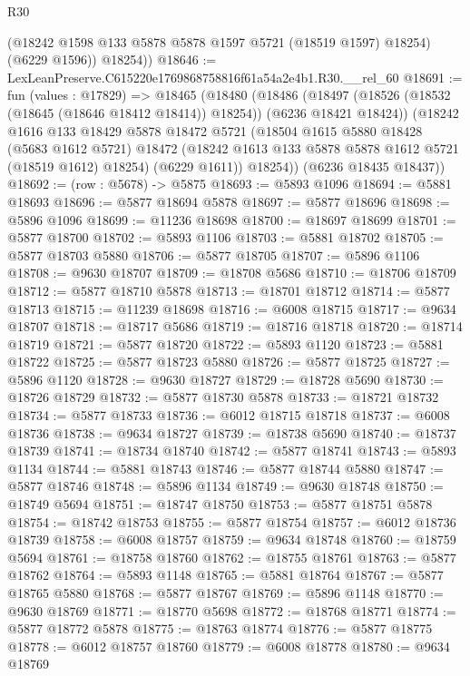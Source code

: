 \begin{lexlean}{R30}
\begin{coremodule}
          (@18242 @1598 @133 @5878 @5878 @1597 @5721 (@18519 @1597) @18254)
          (@6229 @1596))
        @18254))
@18646 := LexLeanPreserve.C615220e1769868758816f61a54a2e4b1.R30.__rel_60
@18691 := fun (values : @17829) =>
  @18465
    (@18480
      (@18486
        (@18497 (@18526 (@18532 (@18645 (@18646 @18412 @18414)) @18254)) (@6236 @18421 @18424))
        (@18242
          @1616
          @133
          @18429
          @5878
          @18472
          @5721
          (@18504
            @1615
            @5880
            @18428
            (@5683 @1612 @5721)
            @18472
            (@18242 @1613 @133 @5878 @5878 @1612 @5721 (@18519 @1612) @18254)
            (@6229 @1611))
          @18254))
      (@6236 @18435 @18437))
@18692 := (row : @5678) -> @5875
@18693 := @5893 @1096
@18694 := @5881 @18693
@18696 := @5877 @18694 @5878
@18697 := @5877 @18696
@18698 := @5896 @1096
@18699 := @11236 @18698
@18700 := @18697 @18699
@18701 := @5877 @18700
@18702 := @5893 @1106
@18703 := @5881 @18702
@18705 := @5877 @18703 @5880
@18706 := @5877 @18705
@18707 := @5896 @1106
@18708 := @9630 @18707
@18709 := @18708 @5686
@18710 := @18706 @18709
@18712 := @5877 @18710 @5878
@18713 := @18701 @18712
@18714 := @5877 @18713
@18715 := @11239 @18698
@18716 := @6008 @18715
@18717 := @9634 @18707
@18718 := @18717 @5686
@18719 := @18716 @18718
@18720 := @18714 @18719
@18721 := @5877 @18720
@18722 := @5893 @1120
@18723 := @5881 @18722
@18725 := @5877 @18723 @5880
@18726 := @5877 @18725
@18727 := @5896 @1120
@18728 := @9630 @18727
@18729 := @18728 @5690
@18730 := @18726 @18729
@18732 := @5877 @18730 @5878
@18733 := @18721 @18732
@18734 := @5877 @18733
@18736 := @6012 @18715 @18718
@18737 := @6008 @18736
@18738 := @9634 @18727
@18739 := @18738 @5690
@18740 := @18737 @18739
@18741 := @18734 @18740
@18742 := @5877 @18741
@18743 := @5893 @1134
@18744 := @5881 @18743
@18746 := @5877 @18744 @5880
@18747 := @5877 @18746
@18748 := @5896 @1134
@18749 := @9630 @18748
@18750 := @18749 @5694
@18751 := @18747 @18750
@18753 := @5877 @18751 @5878
@18754 := @18742 @18753
@18755 := @5877 @18754
@18757 := @6012 @18736 @18739
@18758 := @6008 @18757
@18759 := @9634 @18748
@18760 := @18759 @5694
@18761 := @18758 @18760
@18762 := @18755 @18761
@18763 := @5877 @18762
@18764 := @5893 @1148
@18765 := @5881 @18764
@18767 := @5877 @18765 @5880
@18768 := @5877 @18767
@18769 := @5896 @1148
@18770 := @9630 @18769
@18771 := @18770 @5698
@18772 := @18768 @18771
@18774 := @5877 @18772 @5878
@18775 := @18763 @18774
@18776 := @5877 @18775
@18778 := @6012 @18757 @18760
@18779 := @6008 @18778
@18780 := @9634 @18769

\end{coremodule}
\end{lexlean}
